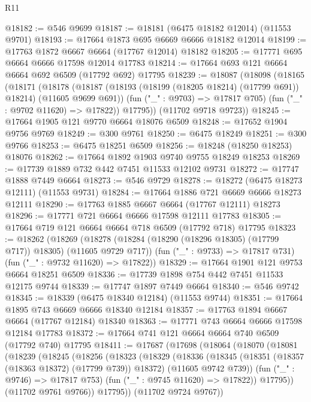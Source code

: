 \begin{lexlean}{R11}
\begin{coremodule}
@18182 := @546 @9699
@18187 := @18181 (@6475 @18182 @12014) (@11553 @9701)
@18193 := @17664 @1873 @695 @6669 @6666 @18182 @12014
@18199 := @17763 @1872 @6667 @6664 (@17767 @12014) @18182
@18205 := @17771 @695 @6664 @6666 @17598 @12014 @17783
@18214 := @17664 @693 @121 @6664 @6664 @692 @6509 (@17792 @692) @17795
@18239 := @18087
    (@18098
      (@18165
        (@18171
          (@18178
            (@18187 (@18193 (@18199 (@18205 @18214) (@17799 @691)) @18214) (@11605 @9699 @691))
            (fun ("_" : @9703) => @17817 @705)
            (fun ("_" : @9702 @11620) => @17822))
          @17795))
      (@11702 @9718 @9723))
@18245 := @17664 @1905 @121 @9770 @6664 @18076 @6509
@18248 := @17652 @1904 @9756 @9769
@18249 := @300 @9761
@18250 := @6475 @18249
@18251 := @300 @9766
@18253 := @6475 @18251 @6509
@18256 := @18248 (@18250 @18253) @18076
@18262 := @17664 @1892 @1903 @9740 @9755 @18249 @18253
@18269 := @17739 @1889 @732 @442 @7451 @11533 @12102 @9731
@18272 := @17747 @1888 @7449 @6664
@18273 := @546 @9729
@18278 := @18272 (@6475 @18273 @12111) (@11553 @9731)
@18284 := @17664 @1886 @721 @6669 @6666 @18273 @12111
@18290 := @17763 @1885 @6667 @6664 (@17767 @12111) @18273
@18296 := @17771 @721 @6664 @6666 @17598 @12111 @17783
@18305 := @17664 @719 @121 @6664 @6664 @718 @6509 (@17792 @718) @17795
@18323 := @18262
    (@18269
      (@18278 (@18284 (@18290 (@18296 @18305) (@17799 @717)) @18305) (@11605 @9729 @717))
      (fun ("_" : @9733) => @17817 @731)
      (fun ("_" : @9732 @11620) => @17822))
@18329 := @17664 @1901 @121 @9753 @6664 @18251 @6509
@18336 := @17739 @1898 @754 @442 @7451 @11533 @12175 @9744
@18339 := @17747 @1897 @7449 @6664
@18340 := @546 @9742
@18345 := @18339 (@6475 @18340 @12184) (@11553 @9744)
@18351 := @17664 @1895 @743 @6669 @6666 @18340 @12184
@18357 := @17763 @1894 @6667 @6664 (@17767 @12184) @18340
@18363 := @17771 @743 @6664 @6666 @17598 @12184 @17783
@18372 := @17664 @741 @121 @6664 @6664 @740 @6509 (@17792 @740) @17795
@18411 := @17687
    (@17698
      (@18064
        (@18070
          (@18081
            (@18239
              (@18245
                (@18256
                  (@18323
                    (@18329
                      (@18336
                        (@18345
                          (@18351 (@18357 (@18363 @18372) (@17799 @739)) @18372)
                          (@11605 @9742 @739))
                        (fun ("_" : @9746) => @17817 @753)
                        (fun ("_" : @9745 @11620) => @17822))
                      @17795))
                  (@11702 @9761 @9766))
                @17795))
            (@11702 @9724 @9767))

\end{coremodule}
\end{lexlean}
